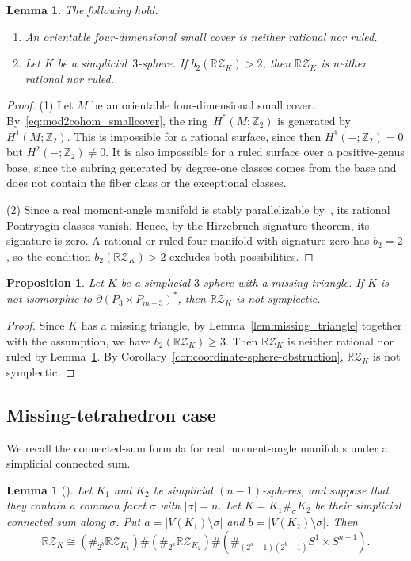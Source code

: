 \documentclass{amsart}
\newtheorem{lemma}[theorem]{Lemma}
\newtheorem{proposition}[theorem]{Proposition}
\numberwithin{equation}{section}
\theoremstyle{definition}
\theoremstyle{remark}
\newcommand{\Z}{\mathbb Z}
\newcommand{\RZ}{\mathbb R\mathcal Z}
\begin{document}
\begin{lemma} \label{lem:rational-ruled-exclusions}
    The following hold.
    \begin{enumerate}
        \item An orientable four-dimensional small cover is neither rational nor ruled.
        \item Let $K$ be a simplicial~$3$-sphere. 
            If $b_2(\RZ_K)>2$, then $\RZ_K$ is neither rational nor ruled.
    \end{enumerate}
\end{lemma}
\begin{proof}
    (1) Let $M$ be an orientable four-dimensional small cover. 
    By~\eqref{eq:mod2cohom_smallcover}, the ring~$H^\ast(M;\Z_2)$ is generated by $H^1(M;\Z_2)$.
    This is impossible for a rational surface, since then $H^1(-;\Z_2)=0$ but $H^2(-;\Z_2)\neq 0$.
    It is also impossible for a ruled surface over a positive-genus base, since the subring generated by degree-one classes comes from the base and does not contain the fiber class or the exceptional classes.
    
    (2) Since a real moment-angle manifold is stably parallelizable by~\cite{Buchstaber-Panov2015book}, its rational Pontryagin classes vanish.
    Hence, by the Hirzebruch signature theorem, its signature is zero.
    A rational or ruled four-manifold with signature zero has $b_2 = 2$, so the condition $b_2(\RZ_K)>2$ excludes both possibilities.
\end{proof}


\begin{proposition}\label{prop:no-missing-triangle}
    Let $K$ be a simplicial $3$-sphere with a missing triangle.
    If $K$ is not isomorphic to $\partial(P_3\times P_{m-3})^\ast$, then $\RZ_K$ is not symplectic.
\end{proposition}
\begin{proof}
    Since $K$ has a missing triangle, by Lemma~\ref{lem:missing_triangle} together with the assumption, we have $b_2(\RZ_K) \geq 3$.
    Then $\RZ_K$ is neither rational nor ruled by Lemma~\ref{lem:rational-ruled-exclusions}.
    By Corollary~\ref{cor:coordinate-sphere-obstruction}, $\RZ_K$ is not symplectic.
\end{proof}


\subsection{Missing-tetrahedron case}
We recall the connected-sum formula for real moment-angle manifolds under a simplicial connected sum.
\begin{lemma}[\cite{Buchstaber-Panov2015book}]\label{lem:RZ-connected-sum}
    Let $K_1$ and $K_2$ be simplicial $(n-1)$-spheres, and suppose that they contain a common facet $\sigma$ with $|\sigma|=n$.  
    Let $K=K_1\#_\sigma K_2$ be their simplicial connected sum along $\sigma$.  
    Put $a=|V(K_1)\setminus \sigma|$ and $b=|V(K_2)\setminus \sigma|$.
    Then 
    $$
        \RZ_K \cong \left(\#_{2^b}\RZ_{K_1}\right) \# \left(\#_{2^a}\RZ_{K_2}\right) \# \left(\#_{(2^a-1)(2^b-1)} S^1\times S^{n-1}\right).
    $$
\end{lemma}
\end{document}
